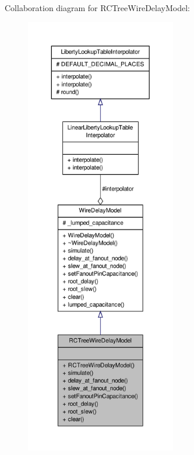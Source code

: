 Collaboration diagram for R\-C\-Tree\-Wire\-Delay\-Model\-:\nopagebreak
\begin{figure}[H]
\begin{center}
\leavevmode
\includegraphics[height=550pt]{classRCTreeWireDelayModel__coll__graph}
\end{center}
\end{figure}
